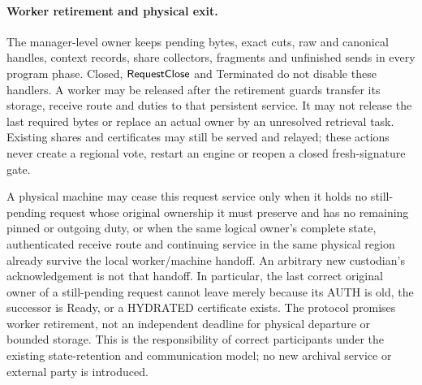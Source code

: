 \paragraph{Worker retirement and physical exit.}
The manager-level owner keeps pending bytes, exact cuts, raw and
canonical handles, context records, share collectors, fragments and
unfinished sends in every program phase. Closed,
$\mathsf{RequestClose}$ and Terminated do not disable these handlers.
A worker may be released after the retirement guards transfer its
storage, receive route and duties to that persistent service. It may
not release the last required bytes or replace an actual owner by an
unresolved retrieval task. Existing shares and certificates may still
be served and relayed; these actions never create a regional vote,
restart an engine or reopen a closed fresh-signature gate.

A physical machine may cease this request service only when it holds
no still-pending request whose original ownership it must preserve and
has no remaining pinned or outgoing duty, or when the same logical
owner's complete state, authenticated receive route and continuing
service in the same physical region already survive the local
worker/machine handoff. An arbitrary
new custodian's acknowledgement is not that handoff. In particular,
the last correct original owner of a still-pending request cannot
leave merely because its AUTH is old, the successor is Ready, or a
HYDRATED certificate exists. The protocol promises worker retirement,
not an independent deadline for physical departure or bounded storage.
This is the responsibility of correct participants under the existing
state-retention and communication model; no new archival service or
external party is introduced.
